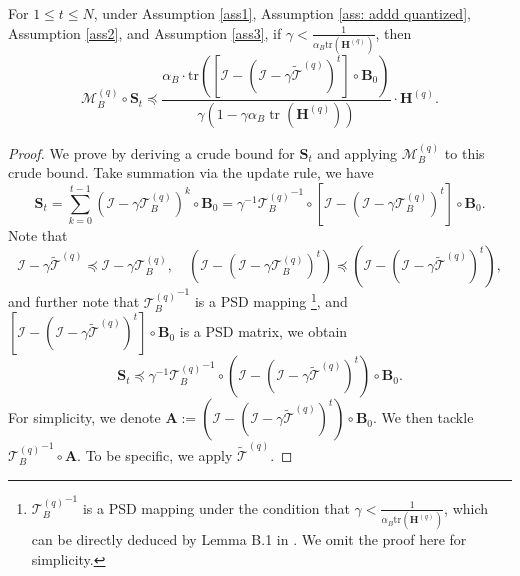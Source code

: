 \documentclass[11pt, letterpaper]{article}
\begin{document}
\begin{lemma}
    For $1 \leq t\leq N$, under Assumption \ref{ass1}, Assumption \ref{ass: addd quantized}, Assumption \ref{ass2}, and Assumption \ref{ass3}, if $\gamma < \frac{1}{\alpha_B\mathrm{tr}(\mathbf{H}^{(q)})}$, then
    \label{A bound for M_B^{(q)} S_t}
    \begin{equation*}
         \mathcal{M}_B^{(q)} \circ \mathbf{S}_t \preceq \frac{\alpha_B\cdot\mathrm{tr}\left(\left[\mathcal{I}-(\mathcal{I}-\gamma\widetilde{\mathcal{T}}^{(q)})^t\right]\circ\mathbf{B}_0\right)}{\gamma(1-\gamma\alpha_B\operatorname{tr}(\mathbf{H}^{(q)}))}\cdot\mathbf{H}^{(q)}.
    \end{equation*}
\end{lemma}
\begin{proof}
    We prove by deriving a crude bound for $\mathbf{S}_t$ and applying $\mathcal{M}_B^{(q)}$ to this crude bound. Take summation via the update rule, we have
    \begin{equation*}
        \mathbf{S}_{t} =\sum_{k=0}^{t-1}(\mathcal{I}-\gamma\mathcal{T}_B^{(q)})^k\circ\mathbf{B}_0=\gamma^{-1}{\mathcal{T}^{(q)}_B}^{-1}\circ\left[\mathcal{I}-(\mathcal{I}-\gamma\mathcal{T}_B^{(q)})^t\right]\circ\mathbf{B}_0.
    \end{equation*}
    Note that
    \begin{equation*}
        \mathcal{I}-\gamma\widetilde{\mathcal{T}}^{(q)} \preceq \mathcal{I}-\gamma\mathcal{T}_B^{(q)}, \quad (\mathcal{I}-(\mathcal{I}-\gamma\mathcal{T}_B^{(q)})^t) \preceq (\mathcal{I}-(\mathcal{I}-\gamma\widetilde{\mathcal{T}}^{(q)})^t),
    \end{equation*}
    and further note that ${\mathcal{T}_B^{(q)}}^{-1}$ is a PSD mapping \footnote{${\mathcal{T}_B^{(q)}}^{-1}$ is a PSD mapping under the condition that $\gamma < \frac{1}{\alpha_B\mathrm{tr}(\mathbf{H}^{(q)})}$, which can be directly deduced by Lemma B.1 in \citet{zou2023benign}. We omit the proof here for simplicity.}, and $[\mathcal{I}-(\mathcal{I}-\gamma\widetilde{\mathcal{T}}^{(q)})^t]\circ\mathbf{B}_0$ is a PSD matrix, we obtain
    \begin{equation*}
        \mathbf{S}_t\preceq\gamma^{-1}{\mathcal{T}_B^{(q)}}^{-1}\circ(\mathcal{I}-(\mathcal{I}-\gamma\widetilde{\mathcal{T}}^{(q)})^t)\circ\mathbf{B}_0.
    \end{equation*}
    For simplicity, we denote $\mathbf{A}:=(\mathcal{I}-(\mathcal{I}-\gamma\widetilde{\mathcal{T}}^{(q)})^t)\circ\mathbf{B}_0$. We then tackle ${\mathcal{T}_B^{(q)}}^{-1}\circ\mathbf{A}$. To be specific, we apply $\widetilde{\mathcal{T}}^{(q)}$.

\end{proof}
\end{document}
